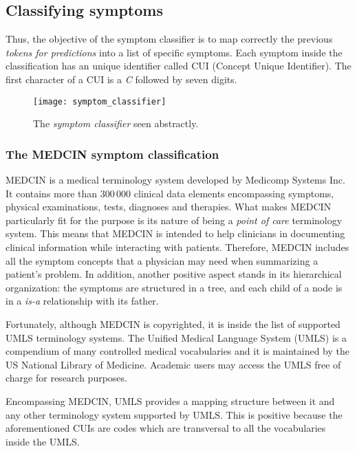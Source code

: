 \subsection{Classifying symptoms}
Thus, the objective of the symptom classifier is to map correctly the previous \textit{tokens for predictions} into a list of specific symptoms. Each symptom inside the classification has an unique identifier called CUI (Concept Unique Identifier). The first character of a CUI is a \textit{C} followed by seven digits.

\begin{figure}[h]
\centering
\texttt{[image: symptom\_classifier]}
\caption{The \textit{symptom classifier} seen abstractly.}
\medskip
\end{figure}

\subsubsection{The MEDCIN symptom classification}
MEDCIN is a medical terminology system developed by Medicomp Systems Inc. It contains more than $300\,000$ clinical data elements encompassing symptoms, physical examinations, tests, diagnoses and therapies. What makes MEDCIN particularly fit for the purpose is its nature of being a \textit{point of care} terminology system. This means that MEDCIN is intended to help clinicians in documenting clinical information while interacting with patients. Therefore, MEDCIN includes all the symptom concepts that a physician may need when summarizing a patient's problem. In addition, another positive aspect stands in its hierarchical organization: the symptoms are structured in a tree, and each child of a node is in a \textit{is-a} relationship with its father.

Fortunately, although MEDCIN is copyrighted, it is inside the list of supported UMLS terminology systems. The Unified Medical Language System (UMLS) is a compendium of many controlled medical vocabularies and it is maintained by the US National Library of Medicine. Academic users may access the UMLS free of charge for research purposes.

Encompassing MEDCIN, UMLS provides a mapping structure between it and any other terminology system supported by UMLS. This is positive because the aforementioned CUIs are codes which are transversal to all the vocabularies inside the UMLS.

